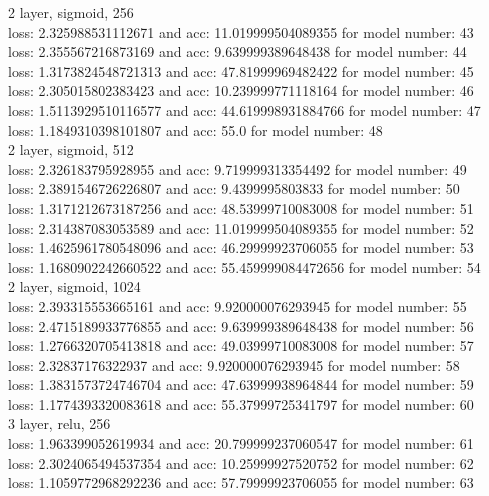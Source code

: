 \documentclass{article}
\begin{document}
2 layer, sigmoid, 256 \\
loss: 2.325988531112671 and acc: 11.019999504089355 for model number: 43 \\
loss: 2.355567216873169 and acc: 9.639999389648438 for model number: 44 \\
loss: 1.3173824548721313 and acc: 47.81999969482422 for model number: 45 \\
loss: 2.305015802383423 and acc: 10.239999771118164 for model number: 46 \\
loss: 1.5113929510116577 and acc: 44.619998931884766 for model number: 47 \\
loss: 1.1849310398101807 and acc: 55.0 for model number: 48 \\
2 layer, sigmoid, 512 \\
loss: 2.326183795928955 and acc: 9.719999313354492 for model number: 49 \\
loss: 2.3891546726226807 and acc: 9.4399995803833 for model number: 50 \\
loss: 1.3171212673187256 and acc: 48.53999710083008 for model number: 51 \\
loss: 2.314387083053589 and acc: 11.019999504089355 for model number: 52 \\
loss: 1.4625961780548096 and acc: 46.29999923706055 for model number: 53 \\
loss: 1.1680902242660522 and acc: 55.459999084472656 for model number: 54 \\
2 layer, sigmoid, 1024 \\
loss: 2.393315553665161 and acc: 9.920000076293945 for model number: 55 \\
loss: 2.4715189933776855 and acc: 9.639999389648438 for model number: 56 \\
loss: 1.2766320705413818 and acc: 49.03999710083008 for model number: 57 \\
loss: 2.32837176322937 and acc: 9.920000076293945 for model number: 58 \\
loss: 1.3831573724746704 and acc: 47.63999938964844 for model number: 59 \\
loss: 1.1774393320083618 and acc: 55.37999725341797 for model number: 60 \\
3 layer, relu, 256 \\
loss: 1.963399052619934 and acc: 20.799999237060547 for model number: 61 \\
loss: 2.3024065494537354 and acc: 10.25999927520752 for model number: 62 \\
loss: 1.1059772968292236 and acc: 57.79999923706055 for model number: 63 \\
\end{document}
